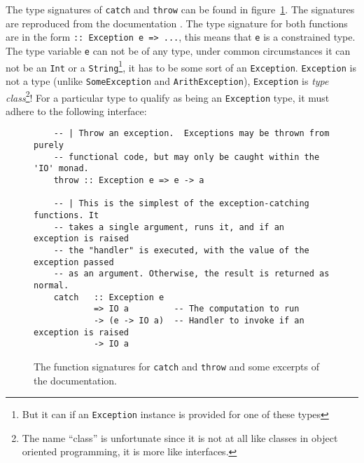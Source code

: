 The type signatures of \texttt{catch} and \texttt{throw} can be found in
figure~\ref{fig:catch_and_throw}. The signatures are reproduced from the
documentation \cite{hackage_base_control_exception}. The type signature
for both functions are in the form \texttt{:: Exception e => ...}, this
means that \texttt{e} is a constrained type. The type variable
\texttt{e} can not be of any type, under common circumstances it can not be an \texttt{Int} or a
\texttt{String}\footnote{But it can if an \texttt{Exception} instance is provided for
  one of these types}, it has to be some sort of an \texttt{Exception}.
\texttt{Exception} is not a type (unlike \texttt{SomeException} and
\texttt{ArithException}), \texttt{Exception} is
\emph{type class}\footnote{The name ``class'' is unfortunate since
it is not at all like classes in object oriented programming, it is
more like interfaces.}! For a particular type to qualify as being an
\texttt{Exception} type, it must adhere to the following interface:

\begin{figure}
\begin{mdframed}
  \begin{verbatim}
    -- | Throw an exception.  Exceptions may be thrown from purely
    -- functional code, but may only be caught within the 'IO' monad.
    throw :: Exception e => e -> a

    -- | This is the simplest of the exception-catching functions. It
    -- takes a single argument, runs it, and if an exception is raised
    -- the "handler" is executed, with the value of the exception passed
    -- as an argument. Otherwise, the result is returned as normal.
    catch   :: Exception e
            => IO a         -- The computation to run
            -> (e -> IO a)  -- Handler to invoke if an exception is raised
            -> IO a
  \end{verbatim}
  \caption{The function signatures for \texttt{catch} and
    \texttt{throw} and some excerpts of the documentation.}
  \label{fig:catch_and_throw}
\end{mdframed}
\end{figure}

